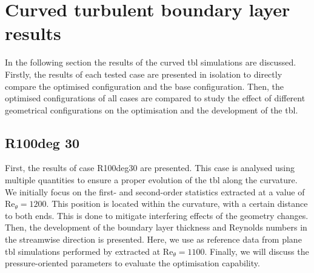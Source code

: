 \section{Curved turbulent boundary layer results}

In the following section the results of the curved \acrshort{tbl} simulations are discussed.
Firstly, the results of each tested case are presented in isolation to directly compare the optimised configuration and the base configuration.
Then, the optimised configurations of all cases are compared to study the effect of different geometrical configurations on the optimisation and the development of the \acrshort{tbl}.


\subsection{R100deg 30}
First, the results of case R100deg30 are presented. 
This case is analysed using  multiple quantities to ensure a proper evolution of the \acrshort{tbl} along the curvature.
We initially focus on the first- and second-order statistics extracted at a value of  $\mathrm{Re}_{\theta} = 1200$. 
This position is located within the curvature, with  a certain distance to both ends. This is done to mitigate interfering effects of the geometry changes.
Then, the development of the boundary layer thickness and Reynolds numbers in the streamwise direction is presented. 
Here, we use as reference data from plane \acrshort{tbl} simulations performed by \citet{jimenez_near-wall_2013} extracted at $\mathrm{Re}_{\theta} = 1100$.
Finally, we will discuss the pressure-oriented parameters to evaluate the optimisation capability. 
